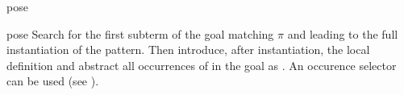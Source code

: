 \begin{tactic}[pose x := $\;\pi$]{pose}
  \begin{tsyntax}[empty]{pose}
  Search for the first subterm  of the goal matching $\pi$ and
  leading to the full instantiation of the pattern. Then introduce,
  after instantiation, the local definition  and abstract
  all occurrences of  in the goal as . An occurence
  selector can be used (see ).
  \end{tsyntax}
\end{tactic}
